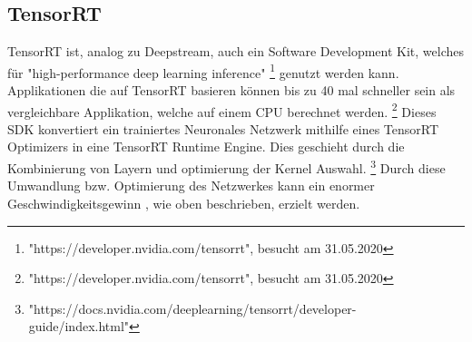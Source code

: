 \documentclass[a4paper,oneside,12pt]{report}
\begin{document}
\begin{onehalfspace}
		\subsection{TensorRT}
		TensorRT ist, analog zu Deepstream, auch ein Software Development Kit, welches für "high-performance deep learning inference"
		\footnote{"https://developer.nvidia.com/tensorrt", besucht am 31.05.2020} genutzt werden kann.
		Applikationen die auf TensorRT basieren können bis zu 40 mal schneller sein als vergleichbare Applikation, welche auf einem CPU berechnet werden.
		\footnote{"https://developer.nvidia.com/tensorrt", besucht am 31.05.2020}
		Dieses SDK konvertiert ein trainiertes Neuronales Netzwerk mithilfe eines TensorRT Optimizers in eine TensorRT Runtime Engine. Dies geschieht durch die Kombinierung von Layern und optimierung der Kernel Auswahl.
		\footnote{"https://docs.nvidia.com/deeplearning/tensorrt/developer-guide/index.html"}
		Durch diese Umwandlung bzw. Optimierung des Netzwerkes kann ein enormer Geschwindigkeitsgewinn , wie oben beschrieben, erzielt werden.
	\end{onehalfspace}
\end{document}
